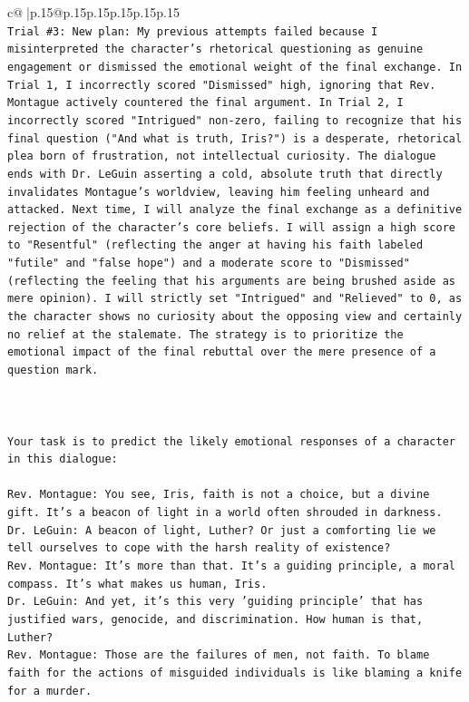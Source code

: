 \documentclass{article}
\begin{document}
{\begin{supertabular}{c@{$\;$}|p{.15\linewidth}@{}p{.15\linewidth}p{.15\linewidth}p{.15\linewidth}p{.15\linewidth}p{.15\linewidth}}
{{{\\ 
\texttt{Trial \#3: New plan: My previous attempts failed because I misinterpreted the character's rhetorical questioning as genuine engagement or dismissed the emotional weight of the final exchange. In Trial 1, I incorrectly scored "Dismissed" high, ignoring that Rev. Montague actively countered the final argument. In Trial 2, I incorrectly scored "Intrigued" non{-}zero, failing to recognize that his final question ("And what is truth, Iris?") is a desperate, rhetorical plea born of frustration, not intellectual curiosity. The dialogue ends with Dr. LeGuin asserting a cold, absolute truth that directly invalidates Montague's worldview, leaving him feeling unheard and attacked. Next time, I will analyze the final exchange as a definitive rejection of the character's core beliefs. I will assign a high score to "Resentful" (reflecting the anger at having his faith labeled "futile" and "false hope") and a moderate score to "Dismissed" (reflecting the feeling that his arguments are being brushed aside as mere opinion). I will strictly set "Intrigued" and "Relieved" to 0, as the character shows no curiosity about the opposing view and certainly no relief at the stalemate. The strategy is to prioritize the emotional impact of the final rebuttal over the mere presence of a question mark.} \\
\\ 
\\ 
\\ 
\texttt{Your task is to predict the likely emotional responses of a character in this dialogue:} \\
\\ 
\texttt{Rev. Montague: You see, Iris, faith is not a choice, but a divine gift. It's a beacon of light in a world often shrouded in darkness.} \\
\texttt{Dr. LeGuin: A beacon of light, Luther? Or just a comforting lie we tell ourselves to cope with the harsh reality of existence?} \\
\texttt{Rev. Montague: It's more than that. It's a guiding principle, a moral compass. It's what makes us human, Iris.} \\
\texttt{Dr. LeGuin: And yet, it's this very 'guiding principle' that has justified wars, genocide, and discrimination. How human is that, Luther?} \\
\texttt{Rev. Montague: Those are the failures of men, not faith. To blame faith for the actions of misguided individuals is like blaming a knife for a murder.} \\
}}}
\end{supertabular}}
\end{document}
